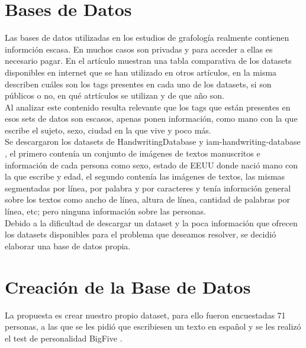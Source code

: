 \documentclass[10pt, a4paper]{article}
\begin{document}
    \section{Bases de Datos}

        Las bases de datos utilizadas en los estudios de grafolog\'ia realmente contienen informci\'on escasa. En muchos casos 
        son privadas y para acceder a ellas es necesario pagar. En el art\'iculo \cite{14} muestran una tabla comparativa de los datasets disponibles en 
        internet que se han utilizado en otros art\'iculos, en la misma describen cu\'ales son los tags presentes en cada uno de los datasets, si son p\'ublicos o no, en qu\'e atrt\'iculos se utilizan y 
        de que a\~no son. \\ 

        Al analizar este contenido resulta relevante que los tags que est\'an presentes en esos sets de datos son escasos, apenas ponen informaci\'on, como mano con la que escribe el sujeto, sexo, 
        ciudad en la que vive y poco m\'as. \\ 

        Se descargaron los datasets de HandwritingDatabase \cite{15} y iam-handwriting-database \cite{16}, el primero conten\'ia un conjunto de im\'agenes de textos manuscritos e informaci\'on de cada persona como sexo, estado de EEUU donde naci\'o 
        mano con la que escribe y edad, el segundo conten\'ia las im\'agenes de textos, las mismas segmentadas por l\'inea, por palabra y por caracteres y ten\'ia informci\'on general sobre los textos como 
        ancho de l\'inea, altura de l\'inea, cantidad de palabras por l\'inea, etc; pero ninguna informaci\'on sobre las personas. \\ 

        Debido a la dificultad de descargar un dataset y la poca informaci\'on que ofrecen los datasets disponibles para el problema que deseamos resolver, se decidi\'o elaborar una base de datos propia.

    \section{Creaci\'on de la Base de Datos}

        La propuesta es crear nuestro propio dataset, para ello fueron encuestadas 71 personas, a las que se les pidi\'o que escribiesen un texto 
        en espa\~nol y se les realiz\'o el test de personalidad BigFive \cite{23}. \\ 
\end{document}

